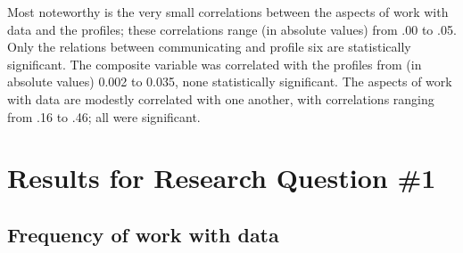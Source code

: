 \documentclass[]{msu-thesis}
\theoremstyle{definition}
\theoremstyle{definition}
\theoremstyle{definition}
\theoremstyle{remark}
\begin{document}
\begin{landscape}\begin{table}

\caption{\label{tab:unnamed-chunk-8}Correlations among study variables}
\centering
{}
\end{table}
\end{landscape}

Most noteworthy is the very small correlations between the aspects of
work with data and the profiles; these correlations range (in absolute
values) from .00 to .05. Only the relations between communicating and
profile six are statistically significant. The composite variable was
correlated with the profiles from (in absolute values) 0.002 to 0.035,
none statistically significant. The aspects of work with data are
modestly correlated with one another, with correlations ranging from .16
to .46; all were significant.

\section{Results for Research Question
\#1}\label{results-for-research-question-1}

\subsection{Frequency of work with
data}\label{frequency-of-work-with-data}
\end{document}
